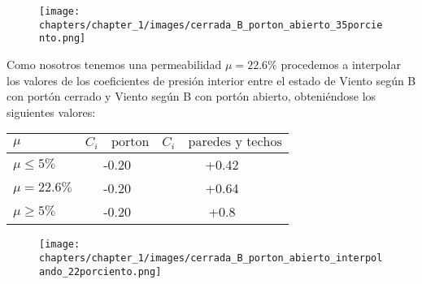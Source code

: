 \begin{enumerate}
\begin{figure}[H]
\begin{center}
     \texttt{[image: chapters/chapter\_1/images/cerrada\_B\_porton\_abierto\_35porciento.png]}
\end{center}
\end{figure}

Como nosotros tenemos una permeabilidad $\mu = 22.6\%$ procedemos a interpolar los valores de los coeficientes de presión interior entre el estado de Viento según B con portón cerrado y Viento según B con portón abierto, obteniéndose los siguientes valores:\\

\begin{table}[H]
  \begin{center}
    \begin{tabular}{l|c|c} %
      $\mu$ & $C_i \quad \text{porton}$ & $C_i \quad \text{paredes y techos}$\\
      \hline
      $\mu \leq 5\%$ & -0.20 & +0.42\\
      $\mu = 22.6\%$ & -0.20 & +0.64\\
      $\mu \geq 5\%$ & -0.20 & +0.8\\
    \end{tabular}
  \end{center}
\end{table}

\begin{figure}[H]
\begin{center}
     \texttt{[image: chapters/chapter\_1/images/cerrada\_B\_porton\_abierto\_interpolando\_22porciento.png]}
\end{center}
\end{figure}


\end{enumerate}
